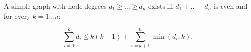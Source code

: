 A simple graph with node degrees $d_1 \ge \dots \ge d_n$ exists iff $d_1 + \dots + d_n$ is even and for every $k = 1\dots n$:

\[ \sum _{i=1}^{k}d_{i}\leq k(k-1)+\sum _{i=k+1}^{n}\min(d_{i},k). \]